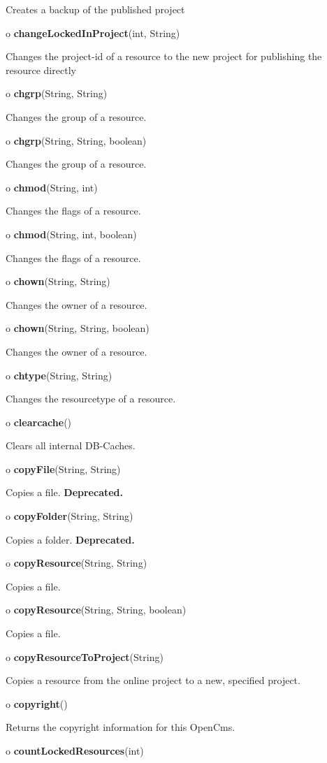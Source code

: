 \begin{description}
Creates a backup of the published project  
\item o {\bf changeLockedInProject}(int, String)  

Changes the project-id of a resource to the new project for publishing the
resource directly  
\item o {\bf chgrp}(String, String)  

Changes the group of a resource.  
\item o {\bf chgrp}(String, String, boolean)  

Changes the group of a resource.  
\item o {\bf chmod}(String, int)  

Changes the flags of a resource.  
\item o {\bf chmod}(String, int, boolean)  

Changes the flags of a resource.  
\item o {\bf chown}(String, String)  

Changes the owner of a resource.  
\item o {\bf chown}(String, String, boolean)  

Changes the owner of a resource.  
\item o {\bf chtype}(String, String)  

Changes the resourcetype of a resource.  
\item o {\bf clearcache}()  

Clears all internal DB-Caches.  
\item o {\bf copyFile}(String, String)  

Copies a file. {\bf Deprecated.}  
\item o {\bf copyFolder}(String, String)  

Copies a folder. {\bf Deprecated.}  
\item o {\bf copyResource}(String, String)  

Copies a file.  
\item o {\bf copyResource}(String, String, boolean)  

Copies a file.  
\item o {\bf copyResourceToProject}(String)  

Copies a resource from the online project to a new, specified project.  
\item o {\bf copyright}()  

Returns the copyright information for this OpenCms.  
\item o {\bf countLockedResources}(int)  


\end{description}
